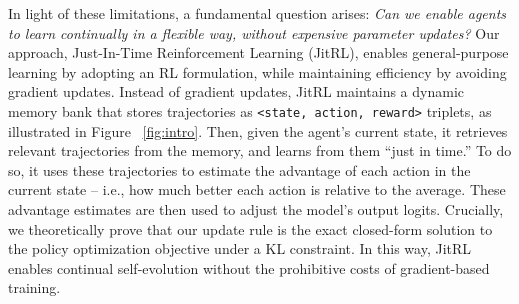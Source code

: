 In light of these limitations, a fundamental question arises: \textit{Can we enable agents to learn continually in a flexible way, without expensive parameter updates?} Our approach, Just-In-Time Reinforcement Learning (JitRL), enables general-purpose learning by adopting an RL formulation, while maintaining efficiency by avoiding gradient updates. Instead of gradient updates, JitRL maintains a dynamic memory bank that stores trajectories as \texttt{<state, action, reward>} triplets, as illustrated in Figure ~\ref{fig:intro}. Then, given the agent's current state, it retrieves relevant trajectories from the memory, and learns from them ``just in time.'' To do so, it uses these trajectories to estimate the advantage of each action in the current state -- i.e., how much better each action is relative to the average. These advantage estimates are then used to adjust the model's output logits. Crucially, we theoretically prove that our update rule is the exact closed-form solution to the policy optimization objective under a KL constraint. In this way, JitRL enables continual self-evolution without the prohibitive costs of gradient-based training. 








